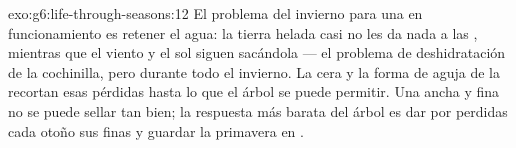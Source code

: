\begin{solution}{exo:g6:life-through-seasons:12}
El problema del invierno para una  en funcionamiento es retener el
agua: la tierra helada casi no les da nada a las , mientras que
el viento y el sol siguen sacándola --- el problema de deshidratación
de la cochinilla, pero durante todo el invierno. La cera y la forma de
aguja de la  recortan esas pérdidas hasta lo que el árbol
se puede permitir. Una  ancha y fina no se puede sellar tan bien;
la respuesta más barata del árbol  es dar por perdidas cada
otoño sus  finas y guardar la primavera en .
\end{solution}

